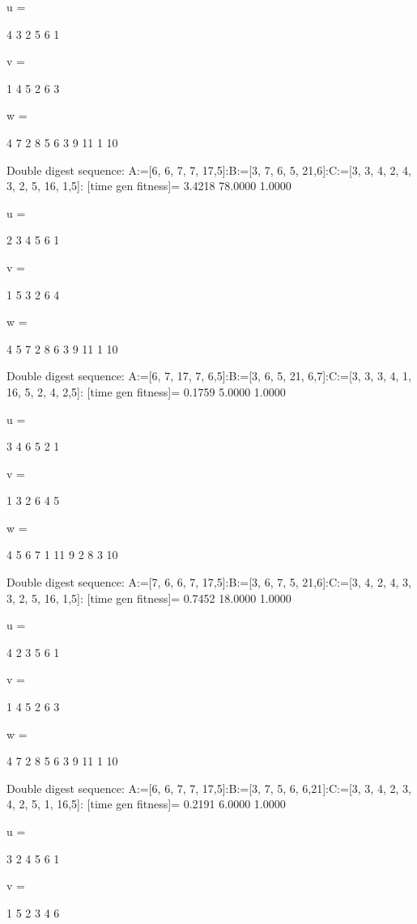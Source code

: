 u =

     4     3     2     5     6     1


v =

     1     4     5     2     6     3


w =

     4     7     2     8     5     6     3     9    11     1    10

Double digest sequence:
A:=[6, 6, 7, 7, 17,5]:B:=[3, 7, 6, 5, 21,6]:C:=[3, 3, 4, 2, 4, 3, 2, 5, 16, 1,5]:
[time gen fitness]=
    3.4218   78.0000    1.0000


u =

     2     3     4     5     6     1


v =

     1     5     3     2     6     4


w =

     4     5     7     2     8     6     3     9    11     1    10

Double digest sequence:
A:=[6, 7, 17, 7, 6,5]:B:=[3, 6, 5, 21, 6,7]:C:=[3, 3, 3, 4, 1, 16, 5, 2, 4, 2,5]:
[time gen fitness]=
    0.1759    5.0000    1.0000


u =

     3     4     6     5     2     1


v =

     1     3     2     6     4     5


w =

     4     5     6     7     1    11     9     2     8     3    10

Double digest sequence:
A:=[7, 6, 6, 7, 17,5]:B:=[3, 6, 7, 5, 21,6]:C:=[3, 4, 2, 4, 3, 3, 2, 5, 16, 1,5]:
[time gen fitness]=
    0.7452   18.0000    1.0000


u =

     4     2     3     5     6     1


v =

     1     4     5     2     6     3


w =

     4     7     2     8     5     6     3     9    11     1    10

Double digest sequence:
A:=[6, 6, 7, 7, 17,5]:B:=[3, 7, 5, 6, 6,21]:C:=[3, 3, 4, 2, 3, 4, 2, 5, 1, 16,5]:
[time gen fitness]=
    0.2191    6.0000    1.0000


u =

     3     2     4     5     6     1


v =

     1     5     2     3     4     6


